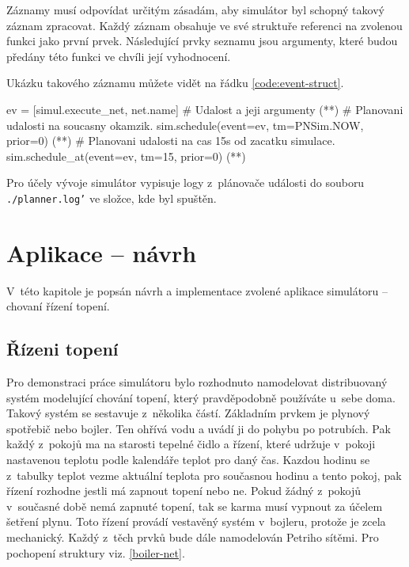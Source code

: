 Záznamy musí odpovídat určitým zásadám, aby simulátor byl schopný takový záznam zpracovat. Každý záznam obsahuje ve své struktuře referenci na zvolenou funkci jako první prvek. Následující prvky seznamu jsou argumenty, které budou předány této funkci ve chvíli její vyhodnocení.

Ukázku takového záznamu můžete vidět na řádku \ref{code:event-struct}.

\begin{python}
  ev = [simul.execute_net, net.name] # Udalost a jeji argumenty (*\label{code:event-struct}*)
  # Planovani udalosti na soucasny okamzik.
  sim.schedule(event=ev, tm=PNSim.NOW, prior=0) (*\label{code:schedule}*)
  # Planovani udalosti na cas 15s od zacatku simulace.
  sim.schedule_at(event=ev, tm=15, prior=0) (*\label{code:schedule-at}*)
\end{python}

Pro účely vývoje simulátor vypisuje logy z~plánovače události do souboru \texttt{./planner.log'} ve složce, kde byl spuštěn.

\chapter{Aplikace -- návrh}
\label{chap:app-arch}

V~této kapitole je popsán návrh a implementace zvolené aplikace simulátoru -- chovaní řízení topení.

\section{Řízeni topení}
\label{sec:tepelne-rizeni}

Pro demonstraci práce simulátoru bylo rozhodnuto namodelovat distribuovaný systém modelující chování topení, který pravděpodobně používáte u~sebe doma. Takový systém se sestavuje z~několika částí. Základním prvkem je plynový spotřebič nebo bojler. Ten ohřívá vodu a uvádí ji do pohybu po potrubích. Pak každý z~pokojů ma na starosti tepelné čidlo a řízení, které udržuje v~pokoji nastavenou teplotu podle kalendáře teplot pro daný čas. Kazdou hodinu se z~tabulky teplot vezme aktuální teplota pro současnou hodinu a tento pokoj, pak řízení rozhodne jestli má zapnout topení nebo ne. Pokud žádný z~pokojů v~současné době nemá zapnuté topení, tak se karma musí vypnout za účelem šetření plynu. Toto řízení provádí vestavěný systém v~bojleru, protože je zcela mechanický. Každý z~těch prvků bude dále namodelován Petriho sítěmi. Pro pochopení struktury viz. \ref{boiler-net}.

